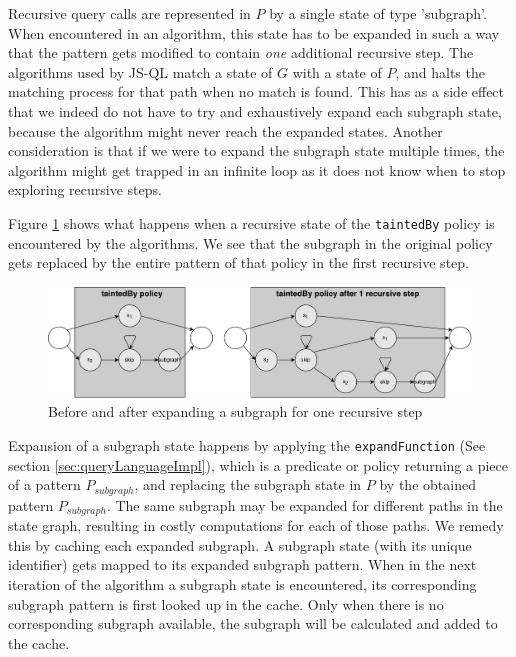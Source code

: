 Recursive query calls are represented in $P$ by a single state of type 'subgraph'. When encountered in an algorithm, this state has to be expanded in such a way that the pattern gets modified to contain \textit{one} additional recursive step. The algorithms used by JS-QL match a state of $G$ with a state of $P$, and halts the matching process for that path when no match is found. This has as a side effect that we indeed do not have to try and exhaustively expand each subgraph state, because the algorithm might never reach the expanded states. Another consideration is that if we were to expand the subgraph state multiple times, the algorithm might get trapped in an infinite loop as it does not know when to stop exploring recursive steps. 

Figure \ref{fig:subgraphExpansion} shows what happens when a recursive state of the \texttt{taintedBy} policy is encountered by the algorithms. We see that the subgraph in the original policy gets replaced by the entire pattern of that policy in the first recursive step.

\begin{figure}[!h]
    \centering
      \includegraphics[width=1\textwidth]{images/subgraphExpansion} 
      \caption{Before and after expanding a subgraph for one recursive step}
    \label{fig:subgraphExpansion}
\end{figure}

Expansion of a subgraph state happens by applying the \texttt{expandFunction} (See section \ref{sec:queryLanguageImpl}), which is a predicate or policy returning a piece of a pattern $P_{subgraph}$, and replacing the subgraph state in $P$ by the obtained pattern $P_{subgraph}$. The same subgraph may be expanded for different paths in the state graph, resulting in costly computations for each of those paths. We remedy this by caching each expanded subgraph. A subgraph state (with its unique identifier) gets mapped to its expanded subgraph pattern. When in the next iteration of the algorithm a subgraph state is encountered, its corresponding subgraph pattern is first looked up in the cache. Only when there is no corresponding subgraph available, the subgraph will be calculated and added to the cache.




